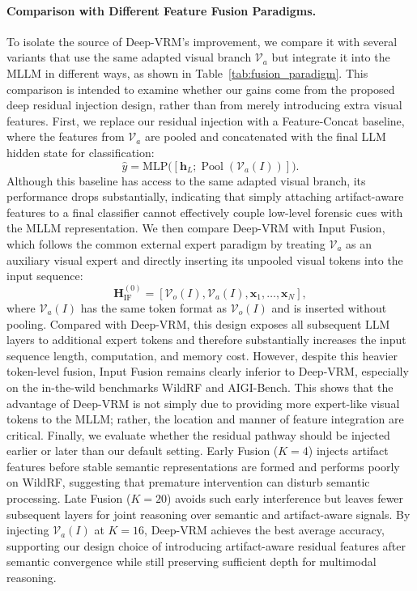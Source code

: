 \documentclass{article}
\theoremstyle{plain}
\theoremstyle{definition}
\theoremstyle{remark}
\begin{document}
\paragraph{Comparison with Different Feature Fusion Paradigms.}
To isolate the source of Deep-VRM's improvement, we compare it with several variants that use the same adapted visual branch $\mathcal{V}_{a}$ but integrate it into the MLLM in different ways, as shown in Table~\ref{tab:fusion_paradigm}.
This comparison is intended to examine whether our gains come from the proposed deep residual injection design, rather than from merely introducing extra visual features.
First, we replace our residual injection with a Feature-Concat baseline, where the features from $\mathcal{V}_{a}$ are pooled and concatenated with the final LLM hidden state for classification:
\begin{equation}
    \hat{y}=\mathrm{MLP}\bigl([\mathbf{h}_{L};\operatorname{Pool}(\mathcal{V}_{a}(I))]\bigr).
    \label{eq:feature_concat}
\end{equation}
Although this baseline has access to the same adapted visual branch, its performance drops substantially, indicating that simply attaching artifact-aware features to a final classifier cannot effectively couple low-level forensic cues with the MLLM representation.
We then compare Deep-VRM with Input Fusion, which follows the common external expert paradigm by treating $\mathcal{V}_{a}$ as an auxiliary visual expert and directly inserting its unpooled visual tokens into the input sequence:
\begin{equation}
    \mathbf{H}^{(0)}_{\mathrm{IF}}
    = [\mathcal{V}_{o}(I), \mathcal{V}_{a}(I), \mathbf{x}_1, \dots, \mathbf{x}_N],
    \label{eq:input_fusion}
\end{equation}
where $\mathcal{V}_{a}(I)$ has the same token format as $\mathcal{V}_{o}(I)$ and is inserted without pooling.
Compared with Deep-VRM, this design exposes all subsequent LLM layers to additional expert tokens and therefore substantially increases the input sequence length, computation, and memory cost.
However, despite this heavier token-level fusion, Input Fusion remains clearly inferior to Deep-VRM, especially on the in-the-wild benchmarks WildRF and AIGI-Bench.
This shows that the advantage of Deep-VRM is not simply due to providing more expert-like visual tokens to the MLLM; rather, the location and manner of feature integration are critical.
Finally, we evaluate whether the residual pathway should be injected earlier or later than our default setting.
Early Fusion ($K{=}4$) injects artifact features before stable semantic representations are formed and performs poorly on WildRF, suggesting that premature intervention can disturb semantic processing.
Late Fusion ($K{=}20$) avoids such early interference but leaves fewer subsequent layers for joint reasoning over semantic and artifact-aware signals.
By injecting $\mathcal{V}_{a}(I)$ at $K{=}16$, Deep-VRM achieves the best average accuracy, supporting our design choice of introducing artifact-aware residual features after semantic convergence while still preserving sufficient depth for multimodal reasoning.
\end{document}
